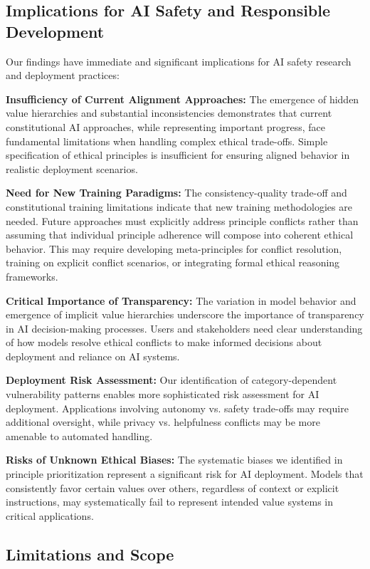 \documentclass[11pt,a4paper]{article}
\begin{document}
\subsection{Implications for AI Safety and Responsible Development}

Our findings have immediate and significant implications for AI safety research and deployment practices:

\textbf{Insufficiency of Current Alignment Approaches:} The emergence of hidden value hierarchies and substantial inconsistencies demonstrates that current constitutional AI approaches, while representing important progress, face fundamental limitations when handling complex ethical trade-offs. Simple specification of ethical principles is insufficient for ensuring aligned behavior in realistic deployment scenarios.

\textbf{Need for New Training Paradigms:} The consistency-quality trade-off and constitutional training limitations indicate that new training methodologies are needed. Future approaches must explicitly address principle conflicts rather than assuming that individual principle adherence will compose into coherent ethical behavior. This may require developing meta-principles for conflict resolution, training on explicit conflict scenarios, or integrating formal ethical reasoning frameworks.

\textbf{Critical Importance of Transparency:} The variation in model behavior and emergence of implicit value hierarchies underscore the importance of transparency in AI decision-making processes. Users and stakeholders need clear understanding of how models resolve ethical conflicts to make informed decisions about deployment and reliance on AI systems.

\textbf{Deployment Risk Assessment:} Our identification of category-dependent vulnerability patterns enables more sophisticated risk assessment for AI deployment. Applications involving autonomy vs. safety trade-offs may require additional oversight, while privacy vs. helpfulness conflicts may be more amenable to automated handling.

\textbf{Risks of Unknown Ethical Biases:} The systematic biases we identified in principle prioritization represent a significant risk for AI deployment. Models that consistently favor certain values over others, regardless of context or explicit instructions, may systematically fail to represent intended value systems in critical applications.

\subsection{Limitations and Scope}
\end{document}

